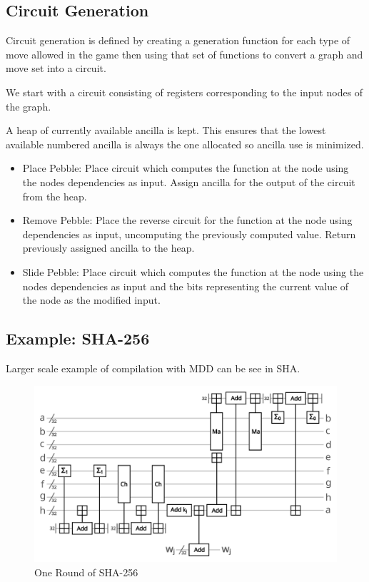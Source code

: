 \subsection{Circuit Generation}
Circuit generation is defined by creating a generation function for each
type of move allowed in the game then using that set of functions to convert a
graph and move set into a circuit.

We start with a circuit consisting of registers corresponding to the input nodes
of the graph.

A heap of currently available ancilla is kept. This ensures that the
lowest available numbered ancilla is always the one allocated so ancilla use is
minimized.

\begin{itemize}
    \item Place Pebble: Place circuit which computes the function at the node
      using the nodes dependencies as input. Assign ancilla for the output of
      the circuit from the heap.
    \item Remove Pebble: Place the reverse circuit for the function at the node
      using dependencies as input, uncomputing the previously computed value.
      Return previously assigned ancilla to the heap.
    \item Slide Pebble: Place circuit which computes the function at the node
      using the nodes dependencies as input and the bits representing the
      current value of the node as the modified input.
\end{itemize}


\subsection{Example: SHA-256}

Larger scale example of compilation with MDD can be see in SHA.

\begin{figure}[ht]
      \capstart
      \centering
      \includegraphics[width=0.9\hsize]{images/sha_round}
      \caption{One Round of SHA-256}
      \label{fig:sha}
\end{figure}

